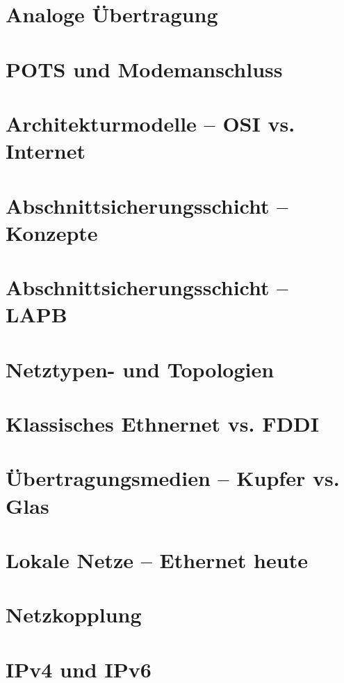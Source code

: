 \documentclass[hidelinks]{article}
\begin{document}
\section{Analoge Übertragung}

\section{POTS und Modemanschluss}

\section{Architekturmodelle -- OSI vs. Internet}

\section{Abschnittsicherungsschicht -- Konzepte}

\section{Abschnittsicherungsschicht -- LAPB}

\section{Netztypen- und Topologien}

\section{Klassisches Ethnernet vs. FDDI}

\section{Übertragungsmedien -- Kupfer vs. Glas}

\section{Lokale Netze -- Ethernet heute}

\section{Netzkopplung}

\section{IPv4 und IPv6}
\end{document}
